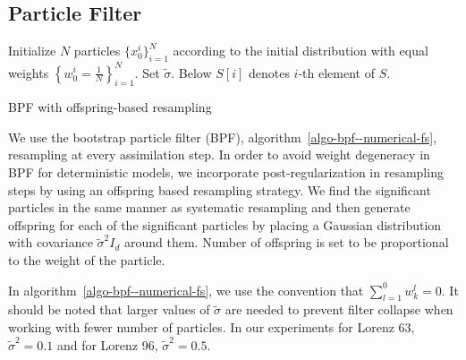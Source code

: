 \subsection{Particle Filter} \label{ssec-pf--numerical-fs}
\begin{algorithm}[!t]
Initialize $N$ particles $\{x_0^i\}_{i=1}^N$ according to the initial distribution with equal weights $\left\{w_0^i=\frac{1}{N}\right\}_{i=1}^N$. Set $\tilde\sigma$. Below $S[i]$ denotes $i$-th element of $S$.\\
 \caption{BPF with offspring-based resampling}
\label{algo-bpf--numerical-fs}
\end{algorithm}
We use the bootstrap particle filter (BPF), algorithm~\ref{algo-bpf--numerical-fs}, resampling at every assimilation step. In order to avoid weight degeneracy in BPF for deterministic models, we incorporate post-regularization \cite{farchi2018comparison} in resampling steps by using an offspring based resampling strategy. We find the significant particles in the same manner as systematic resampling \cite{doucet2009tutorial} and then generate offspring for each of the significant particles by placing a Gaussian distribution with covariance $\tilde\sigma^2I_d$ around them. Number of offspring is set to be proportional to the weight of the particle.

In algorithm~\ref{algo-bpf--numerical-fs}, we use the convention that $\sum_{l=1}^0w^l_k=0$. It should be noted that larger values of $\tilde\sigma$ are needed to prevent filter collapse when working with fewer number of particles. In our experiments for Lorenz 63, $\tilde\sigma^2=0.1$ and for Lorenz 96, $\tilde\sigma^2=0.5$.
